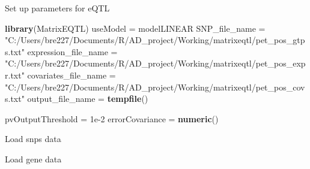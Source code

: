 \documentclass[]{article}
\newenvironment{Shaded}{\begin{snugshade}}{\end{snugshade}}
\newcommand{\KeywordTok}[1]{\textcolor[rgb]{0.13,0.29,0.53}{\textbf{#1}}}
\newcommand{\DecValTok}[1]{\textcolor[rgb]{0.00,0.00,0.81}{#1}}
\newcommand{\FloatTok}[1]{\textcolor[rgb]{0.00,0.00,0.81}{#1}}
\newcommand{\CharTok}[1]{\textcolor[rgb]{0.31,0.60,0.02}{#1}}
\newcommand{\StringTok}[1]{\textcolor[rgb]{0.31,0.60,0.02}{#1}}
\newcommand{\OperatorTok}[1]{\textcolor[rgb]{0.81,0.36,0.00}{\textbf{#1}}}
\newcommand{\NormalTok}[1]{#1}
\begin{document}
Set up parameters for eQTL

\begin{Shaded}
\begin{Highlighting}[]
\KeywordTok{library}\NormalTok{(MatrixEQTL)}
\NormalTok{useModel =}\StringTok{ }\NormalTok{modelLINEAR}
\NormalTok{SNP_file_name =}\StringTok{ "C:/Users/bre227/Documents/R/AD_project/Working/matrixeqtl/pet_pos_gtps.txt"}
\NormalTok{expression_file_name =}\StringTok{ "C:/Users/bre227/Documents/R/AD_project/Working/matrixeqtl/pet_pos_expr.txt"}
\NormalTok{covariates_file_name =}\StringTok{ "C:/Users/bre227/Documents/R/AD_project/Working/matrixeqtl/pet_pos_covs.txt"}
\NormalTok{output_file_name =}\StringTok{ }\KeywordTok{tempfile}\NormalTok{()}

\NormalTok{pvOutputThreshold =}\StringTok{ }\FloatTok{1e-2}
\NormalTok{errorCovariance =}\StringTok{ }\KeywordTok{numeric}\NormalTok{()}
\end{Highlighting}
\end{Shaded}

Load snps data

\begin{Shaded}
\end{Shaded}

Load gene data

\begin{Shaded}
\end{Shaded}
\end{document}
